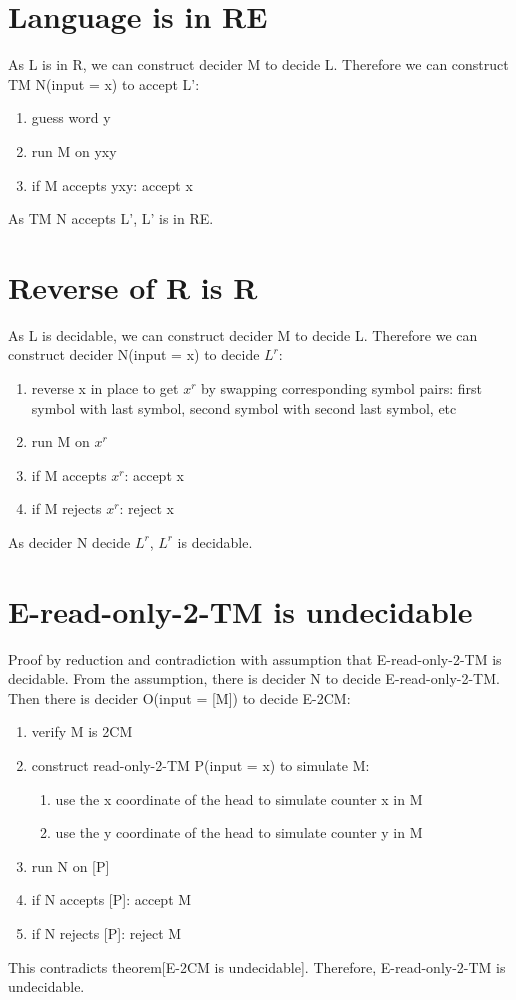 \documentclass{article}
\begin{document}
\section{Language is in RE}
As L is in R, we can construct decider M to decide L. Therefore we can construct TM N(input = x) to accept L':
\begin{enumerate}
	\item guess word y
	\item run M on yxy
	\item if M accepts yxy: accept x
\end{enumerate}
As TM N accepts L', L' is in RE.

\section{Reverse of R is R}
As L is decidable, we can construct decider M to decide L. Therefore we can construct decider N(input = x) to decide $ L^r $:
\begin{enumerate}
	\item reverse x in place to get $ x^r $ by swapping corresponding symbol pairs: first symbol with last symbol, second symbol with second last symbol, etc
	\item run M on $ x^r $
	\item if M accepts $ x^r $: accept x
	\item if M rejects $ x^r $: reject x
\end{enumerate}
As decider N decide $ L^r $, $ L^r $ is decidable.

\section{E-read-only-2-TM is undecidable}
Proof by reduction and contradiction with assumption that E-read-only-2-TM is decidable. From the assumption, there is decider N to decide E-read-only-2-TM. Then there is decider O(input = [M]) to decide E-2CM:
\begin{enumerate}
	\item verify M is 2CM
	\item construct read-only-2-TM P(input = x) to simulate M:
	\begin{enumerate}
		\item use the x coordinate of the head to simulate counter x in M
		\item use the y coordinate of the head to simulate counter y in M
	\end{enumerate}
	\item run N on [P]
	\item if N accepts [P]: accept M
	\item if N rejects [P]: reject M
\end{enumerate}
This contradicts theorem[E-2CM is undecidable]. Therefore, E-read-only-2-TM is undecidable.
\end{document}
